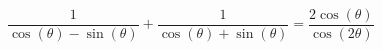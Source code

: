 {$\dfrac{1}{\cos(\theta) - \sin(\theta)} + \dfrac{1}{\cos(\theta) + \sin(\theta)} = \dfrac{2\cos(\theta)}{\cos(2\theta)}$}
{}